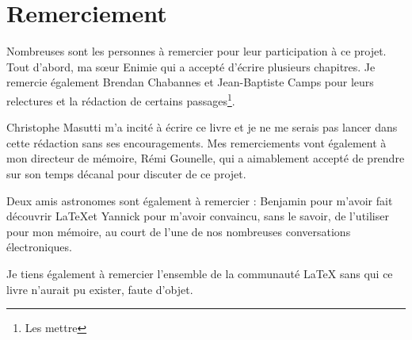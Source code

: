 \section{Remerciement}

Nombreuses sont les personnes à remercier pour leur participation à ce projet. Tout d'abord, ma sœur Enimie qui a accepté d'écrire plusieurs chapitres. Je remercie également Brendan Chabannes et Jean-Baptiste Camps pour leurs relectures et la rédaction de certains passages\footnote{Les mettre}.

Christophe Masutti m'a incité à écrire ce livre et je ne me serais pas lancer dans cette rédaction sans ses encouragements. Mes remerciements vont également à mon directeur de mémoire, Rémi Gounelle, qui a aimablement accepté de prendre sur son temps décanal pour discuter de ce projet.

Deux amis astronomes sont également à remercier : Benjamin pour m'avoir fait découvrir  \LaTeX et Yannick pour m'avoir convaincu, sans le savoir, de l'utiliser pour mon mémoire, au court de l'une de nos nombreuses conversations électroniques.

Je tiens également à remercier l'ensemble de la communauté \LaTeX{} sans qui ce livre n'aurait pu exister, faute d'objet.
 

